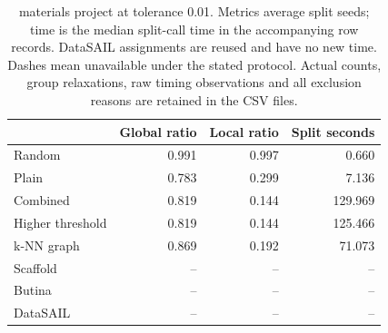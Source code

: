 \begin{table}[htbp]\centering\small
\begin{tabular}{lrrr}
\toprule
 & Global ratio & Local ratio & Split seconds \\
\midrule
Random & 0.991 & 0.997 & 0.660 \\
Plain & 0.783 & 0.299 & 7.136 \\
Combined & 0.819 & 0.144 & 129.969 \\
Higher threshold & 0.819 & 0.144 & 125.466 \\
k-NN graph & 0.869 & 0.192 & 71.073 \\
Scaffold & -- & -- & -- \\
Butina & -- & -- & -- \\
DataSAIL & -- & -- & -- \\
\bottomrule
\end{tabular}

\caption{materials project at tolerance 0.01. Metrics average split seeds; time is the median split-call time in the accompanying row records. DataSAIL assignments are reused and have no new time. Dashes mean unavailable under the stated protocol. Actual counts, group relaxations, raw timing observations and all exclusion reasons are retained in the CSV files.}\end{table}
